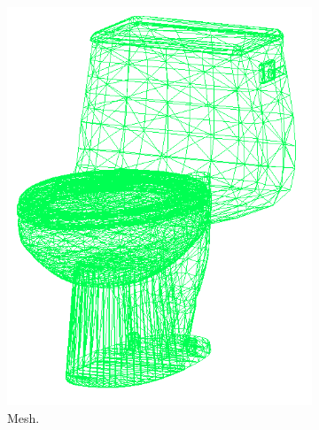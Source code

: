 \begin{figure}[!t]
\begin{subfigure}{0.32\linewidth}
    \includegraphics[width=\linewidth]{Figures/ObjRecog/toilet_off.png}
    \caption{Mesh.}
    \label{fig:objrecog:dataproc:mesh}
  \end{subfigure}
  \begin{subfigure}{0.32\linewidth}

\end{subfigure}
\end{figure}
